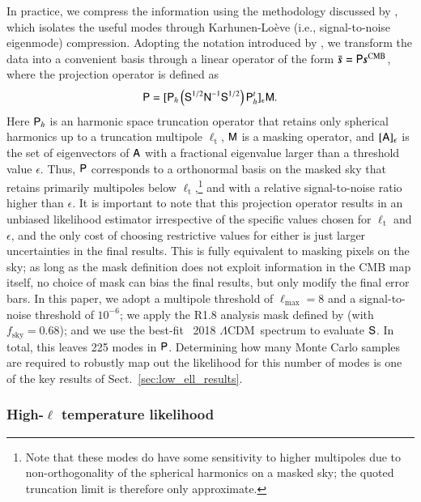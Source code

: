 \documentclass[twocolumn]{aa}
\def\LCDM{$\Lambda$CDM}
\newcommand{\A}[0]{\tens{A}}
\newcommand{\s}[0]{\vec{s}}
\newcommand{\N}[0]{\tens{N}}
\newcommand{\M}[0]{\tens{M}}
\renewcommand{\S}[0]{\tens{S}}
\renewcommand{\P}[0]{\tens{P}}
\begin{document}
In practice, we compress the information using the methodology
discussed by \citet{tegmark1997}, which isolates the useful modes
through Karhunen-Lo\`eve (i.e., signal-to-noise eigenmode)
compression. Adopting the notation introduced by \citet{gjerlow2015},
we transform the data into a convenient basis through a linear
operator of the form $\bar{\s}=\P\s^{\mathrm{CMB}}$, where the
projection operator is defined as
\begin{equation}
  \label{eq:s2n_operator}
  \P = \lbrack\P_h\left( \S^{1/2}\N^{-1}\S^{1/2} \right)\P_h^t\rbrack_\epsilon\M.
\end{equation}
Here $\P_h$ is an harmonic space truncation operator that retains only
spherical harmonics up to a truncation multipole $\ell_\mathrm{t}$,
$\M$ is a masking operator, and $\lbrack\A\rbrack_\epsilon$ is the set
of eigenvectors of $\A$ with a fractional eigenvalue larger than a
threshold value $\epsilon$. Thus, $\P$ corresponds to a orthonormal
basis on the masked sky that retains primarily multipoles below
$\ell_\mathrm{t}$,\footnote{Note that these modes do have some sensitivity to higher multipoles due to non-orthogonality of the spherical harmonics on a masked sky; the quoted truncation limit is therefore only approximate.} and with a relative
signal-to-noise ratio higher than $\epsilon$. It is important to note
that this projection operator results in an unbiased likelihood
estimator irrespective of the specific values chosen for
$\ell_\mathrm{t}$ and $\epsilon$, and the only cost of choosing
restrictive values for either is just larger uncertainties in the
final results. This is fully equivalent to masking pixels on the sky;
as long as the mask definition does not exploit information in the CMB
map itself, no choice of mask can bias the final results, but only
modify the final error bars. In this paper, we adopt a multipole
threshold of $ \ell_{\mathrm{max}}=8$ and a signal-to-noise threshold
of $10^{-6}$; we apply the R1.8 analysis mask defined by
\citet{planck2016-l05} (with $f_{\mathrm{sky}}=0.68$); and we use the
best-fit \Planck\ 2018 \LCDM\ spectrum to evaluate $\S$. In total,
this leaves 225 modes in $\P$. Determining how many Monte Carlo
samples are required to robustly map out the likelihood for this
number of modes is one of the key results of
Sect.~\ref{sec:low_ell_results}.

\subsubsection{High-$\ell$ temperature likelihood}
\end{document}
